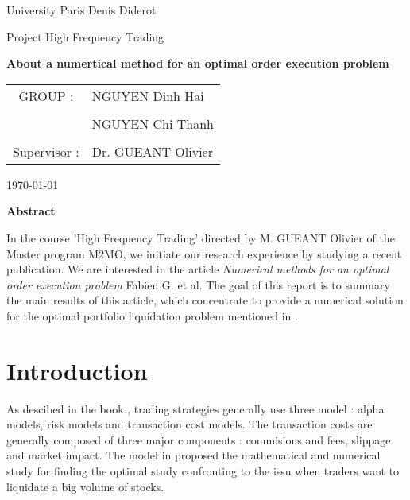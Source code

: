 \documentclass{article}
\begin{document}
\baselineskip 17pt

\begin{titlepage}
\vspace{3in}
\begin{center}
\LARGE{\sc  University Paris Denis Diderot}

\vspace{1.0in}

\Large {\sc Project High Frequency Trading}
\vspace{1.0in}

\LARGE{\bf About a numertical method for an optimal order execution problem}
\Large
\begin{tabular}{c l}
GROUP :  & NGUYEN Dinh Hai
\\
\\
& NGUYEN Chi Thanh
\\
\\
Supervisor : & Dr. GUEANT Olivier 
\end{tabular}
\end{center}

\vspace{0.5in}

\begin{center}
{\sc \today}
\vspace{0.5in}
\end{center}

\begin{center}
{\bf Abstract}
\end{center}
In the course 'High Frequency Trading' directed by M. GUEANT Olivier of the Master program M2MO, we initiate our research experience by studying a recent publication. We are interested in the article \textit{ Numerical methods for an optimal order execution problem} Fabien G. et al. The goal of this report is to summary the main results of this article, which concentrate to provide a numerical solution for the optimal portfolio liquidation problem mentioned in \cite{KP}. 

\end{titlepage}



\newpage
{}

\section{Introduction}
\par As descibed in the book \cite{NARANG}, trading strategies generally use three model : alpha models, risk models and transaction cost models. The transaction costs are generally composed of three major components : commisions and fees, slippage and market impact. The model in \cite{KP} \cite{GMP} proposed the mathematical and numerical study for finding the optimal study confronting to the issu when traders want to liquidate a big volume of stocks.      
\end{document}
